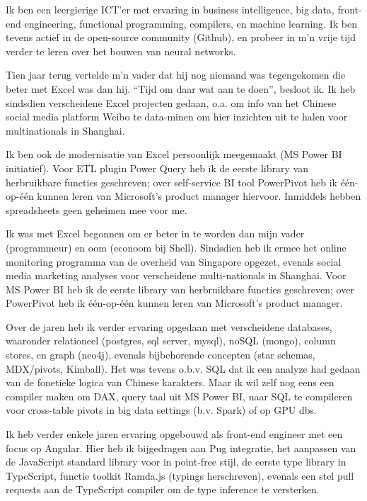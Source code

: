 
Ik ben een leergierige ICT’er met ervaring in business intelligence, big data, front-end engineering, functional programming, compilers, en machine learning. Ik ben tevens actief in de open-source community (Github), en probeer in m’n vrije tijd verder te leren over het bouwen van neural networks.

Tien jaar terug vertelde m’n vader dat hij nog niemand was tegengekomen die beter met Excel was dan hij. “Tijd om daar wat aan te doen”, besloot ik. Ik heb sindsdien verscheidene Excel projecten gedaan, o.a. om info van het Chinese social media platform Weibo te data-minen om hier inzichten uit te halen voor multinationals in Shanghai.

Ik ben ook de modernisatie van Excel persoonlijk meegemaakt (MS Power BI initiatief). Voor ETL plugin Power Query heb ik de eerste library van herbruikbare functies geschreven; over self-service BI tool PowerPivot heb ik één-op-één kunnen leren van Microsoft’s product manager hiervoor. Inmiddels hebben spreadsheets geen geheimen mee voor me.

Ik was met Excel begonnen om er beter in te worden dan mijn vader (programmeur) en oom (econoom bij Shell). Sindsdien heb ik ermee het online monitoring programma van de overheid van Singapore opgezet, evenals social media marketing analyses voor verscheidene multi-nationals in Shanghai. Voor MS Power BI heb ik de eerste library van herbruikbare functies geschreven; over PowerPivot heb ik één-op-één kunnen leren van Microsoft’s product manager.

Over de jaren heb ik verder ervaring opgedaan met verscheidene databases, waaronder relationeel (postgres, sql server, mysql), noSQL (mongo), column stores, en graph (neo4j), evenals bijbehorende concepten (star schemas, MDX/pivots, Kimball). Het was tevens o.b.v. SQL dat ik een analyze had gedaan van de fonetieke logica van Chinese karakters. Maar ik wil zelf nog eens een compiler maken om DAX, query taal uit MS Power BI, naar SQL te compileren voor cross-table pivots in big data settings (b.v. Spark) of op GPU dbs.

Ik heb verder enkele jaren ervaring opgebouwd als front-end engineer met een focus op Angular. Hier heb ik bijgedragen aan Pug integratie, het aanpassen van de JavaScript standard library voor in point-free stijl, de eerste type library in TypeScript, functie toolkit Ramda.js (typings herschreven), evenals een stel pull requests aan de TypeScript compiler om de type inference te versterken.

